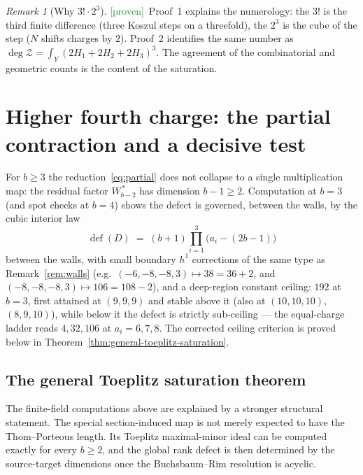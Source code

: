 \documentclass[11pt]{article}
\theoremstyle{plain}
\theoremstyle{definition}
\theoremstyle{remark}
\newtheorem{remark}[theorem]{Remark}
\newcommand{\Proven}{\textcolor{ForestGreen}{\textsf{[proven]}}}
\newcommand{\cZ}{\mathcal{Z}}
\newcommand{\defect}{\operatorname{def}}
\begin{document}
\begin{remark}[Why $3!\cdot 2^3$]\label{rem:why48}
\Proven\ Proof~1 explains the numerology: the $3!$ is the third finite difference (three Koszul steps on a threefold), the $2^3$ is the cube of the step ($N$ shifts charges by $2$). Proof~2 identifies the same number as $\deg\cZ=\int_Y(2H_1+2H_2+2H_3)^3$. The agreement of the combinatorial and geometric counts is the content of the saturation.
\end{remark}

\section{Higher fourth charge: the partial contraction and a decisive test}\label{sec:bgen}

For $b\ge 3$ the reduction~\eqref{eq:partial} does not collapse to a single multiplication map: the residual factor $W_{b-2}^{\,*}$ has dimension $b-1\ge 2$. Computation at $b=3$ (and spot checks at $b=4$) shows the defect is governed, between the walls, by the cubic interior law
\begin{equation}\label{eq:blaw}
\defect(D)\;=\;(b+1)\prod_{i=1}^{3}\big(a_i-(2b-1)\big)
\end{equation}
between the walls, with small boundary $h^1$ corrections of the same type as Remark~\ref{rem:walls} (e.g.\ $(-6,-8,-8,3)\mapsto 38=36+2$, and $(-8,-8,-8,3)\mapsto 106=108-2$), and a deep-region constant ceiling: $192$ at $b=3$, first attained at $(9,9,9)$ and stable above it (also at $(10,10,10)$, $(8,9,10)$), while below it the defect is strictly sub-ceiling --- the equal-charge ladder reads $4,32,106$ at $a_i=6,7,8$. The corrected ceiling criterion is proved below in Theorem~\ref{thm:general-toeplitz-saturation}.


\subsection{The general Toeplitz saturation theorem}\label{sec:general-saturation}

The finite-field computations above are explained by a stronger structural statement.  The special section-induced map is not merely expected to have the Thom--Porteous length.  Its Toeplitz maximal-minor ideal can be computed exactly for every $b\ge2$, and the global rank defect is then determined by the source-target dimensions once the Buchsbaum--Rim resolution is acyclic.
\end{document}
